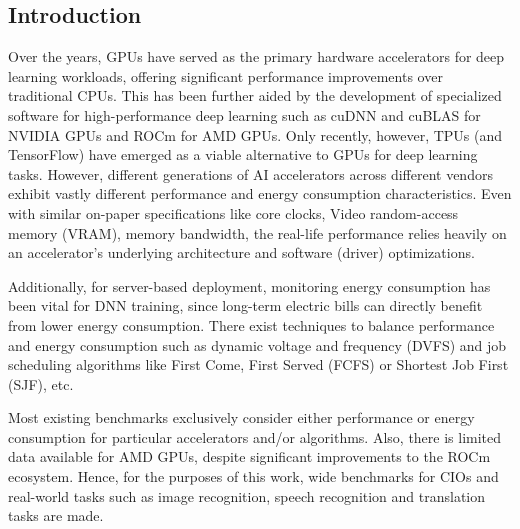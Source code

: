 \subsection{Introduction}
\label{subsec:introduction3}

Over the years, GPUs have served as the primary hardware accelerators for deep learning workloads,
offering significant performance improvements over traditional CPUs.
This has been further aided by the development of specialized software for high-performance deep learning such as cuDNN and cuBLAS for NVIDIA GPUs and ROCm for AMD GPUs.
Only recently, however, TPUs (and TensorFlow) have emerged as a viable alternative to GPUs for deep learning tasks.
However,
different generations of AI accelerators across different vendors exhibit vastly different performance and energy consumption characteristics.
Even with similar on-paper specifications like core clocks, Video random-access memory (VRAM), memory bandwidth,
the real-life performance relies heavily on an accelerator's underlying architecture and
software (driver) optimizations.

Additionally, for server-based deployment,
monitoring energy consumption has been vital for DNN training,
since long-term electric bills can directly benefit from lower energy consumption.
There exist techniques to balance performance and energy consumption such as dynamic voltage and frequency
(DVFS) and job scheduling algorithms like First Come, First Served (FCFS) or Shortest Job First (SJF), etc.

Most existing benchmarks exclusively consider either performance or energy consumption for particular accelerators and/or algorithms.
Also, there is limited data available for AMD GPUs, despite significant improvements to the ROCm ecosystem.
Hence, for the purposes of this work,
wide benchmarks for CIOs and real-world tasks such as image recognition,
speech recognition and translation tasks are made.